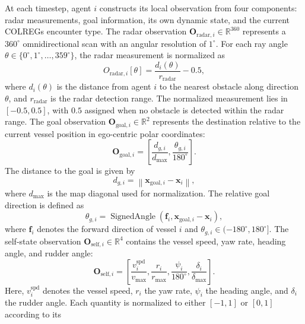 \documentclass[final,5p,times,twocolumn]{elsarticle}
\begin{document}
{\color{violet}
At each timestep, agent $i$ constructs its local observation from four
components: radar measurements, goal information, its own dynamic state,
and the current COLREGs encounter type.
The radar observation
$\mathbf{O}_{\mathrm{radar},i}\in\mathbb{R}^{360}$
represents a $360^\circ$ omnidirectional scan with an angular resolution
of $1^\circ$. For each ray angle
$\theta\in\{0^\circ,1^\circ,\ldots,359^\circ\}$, the radar measurement
is normalized as
\begin{equation}
O_{\mathrm{radar},i}[\theta]
=\frac{d_i(\theta)}{r_{\mathrm{radar}}}-0.5,
\end{equation}
where $d_i(\theta)$ is the distance from agent $i$ to the nearest
obstacle along direction $\theta$, and $r_{\mathrm{radar}}$ is the radar
detection range. The normalized measurement lies in
$[-0.5,0.5]$, with $0.5$ assigned when no obstacle is detected within
the radar range.
The goal observation
$\mathbf{O}_{\mathrm{goal},i}\in\mathbb{R}^{2}$
represents the destination relative to the current vessel position in
ego-centric polar coordinates:
\begin{equation}
\mathbf{O}_{\mathrm{goal},i}
=\left[
\frac{d_{g,i}}{d_{\mathrm{max}}},
\frac{\theta_{g,i}}{180^\circ}
\right].
\end{equation}
The distance to the goal is given by
\begin{equation}
d_{g,i}
=\left\|
\mathbf{x}_{\mathrm{goal},i}-\mathbf{x}_i
\right\|,
\end{equation}
where $d_{\mathrm{max}}$ is the map diagonal used for normalization.
The relative goal direction is defined as
\begin{equation}
\theta_{g,i}
=\operatorname{SignedAngle}
\left(
\mathbf{f}_i,
\mathbf{x}_{\mathrm{goal},i}-\mathbf{x}_i
\right),
\end{equation}
where $\mathbf{f}_i$ denotes the forward direction of vessel $i$ and
$\theta_{g,i}\in(-180^\circ,180^\circ]$.
The self-state observation
$\mathbf{O}_{\mathrm{self},i}\in\mathbb{R}^{4}$
contains the vessel speed, yaw rate, heading angle, and rudder angle:
\begin{equation}
\mathbf{O}_{\mathrm{self},i}
=\left[
\frac{v_i^{\mathrm{spd}}}{v_{\mathrm{max}}},
\frac{r_i}{r_{\mathrm{max}}},
\frac{\psi_i}{180^\circ},
\frac{\delta_i}{\delta_{\mathrm{max}}}
\right].
\end{equation}
Here, $v_i^{\mathrm{spd}}$ denotes the vessel speed, $r_i$ the yaw rate,
$\psi_i$ the heading angle, and $\delta_i$ the rudder angle. Each
quantity is normalized to either $[-1,1]$ or $[0,1]$ according to its
}
\end{document}
